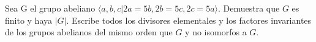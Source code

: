 \question
Sea G el grupo abeliano $\langle a,b,c | 2a=5b,2b=5c,2c=5a \rangle$.
Demuestra que $G$ es finito y haya $|G|$. 
Escribe todos los divisores elementales y los factores invariantes de 
los grupos abelianos del mismo orden que $G$ y no isomorfos a $G$.